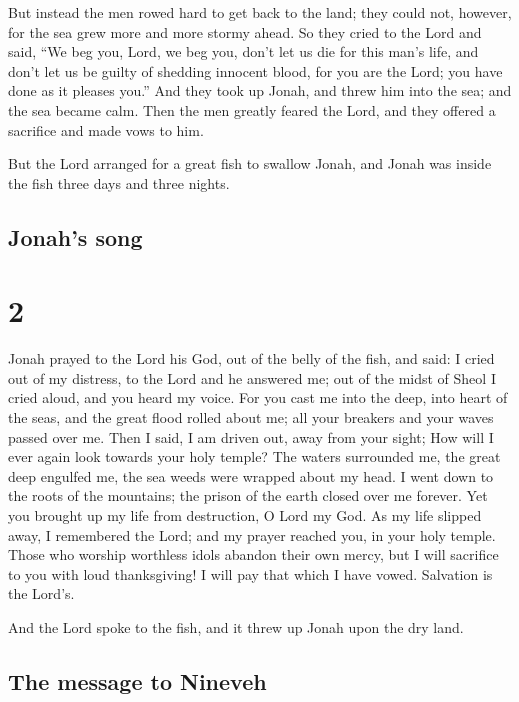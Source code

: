 But instead the men rowed hard to get back to the land;
they could not, however, for the sea grew more and more stormy ahead.
 So they cried to the Lord and said, ``We beg you, Lord, we
beg you, don't let us die for this man's life, and don't let us be
guilty of shedding innocent blood, for you are the Lord; you have done
as it pleases you.''  And they took up Jonah, and threw him
into the sea; and the sea became calm.  Then the men
greatly feared the Lord, and they offered a sacrifice and made vows to
him.

 But the Lord arranged for a great fish to swallow Jonah,
and Jonah was inside the fish three days and three nights.

\hypertarget{jonahs-song}{%
\subsection{Jonah's song}\label{jonahs-song}}

\hypertarget{section-1}{%
\section{2}\label{section-1}}

 Jonah prayed to the Lord his God, out of the belly of the
fish,  and said: I cried out of my distress, to the Lord and
he answered me; out of the midst of Sheol I cried aloud, and you heard
my voice.  For you cast me into the deep, into heart of the
seas, and the great flood rolled about me; all your breakers and your
waves passed over me.  Then I said, I am driven out, away
from your sight; How will I ever again look towards your holy temple?
 The waters surrounded me, the great deep engulfed me, the
sea weeds were wrapped about my head.  I went down to the
roots of the mountains; the prison of the earth closed over me forever.
Yet you brought up my life from destruction, O Lord my God. 
As my life slipped away, I remembered the Lord; and my prayer reached
you, in your holy temple.  Those who worship worthless idols
abandon their own mercy,  but I will sacrifice to you with
loud thanksgiving! I will pay that which I have vowed. Salvation is the
Lord's.

 And the Lord spoke to the fish, and it threw up Jonah upon
the dry land.

\hypertarget{the-message-to-nineveh}{%
\subsection{The message to Nineveh}\label{the-message-to-nineveh}}

